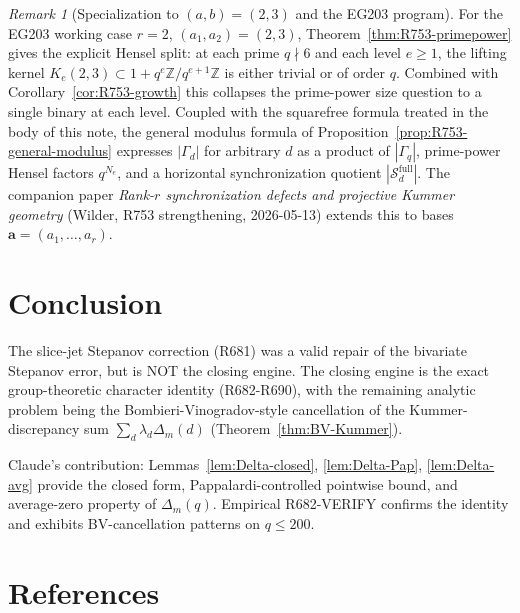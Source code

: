 \documentclass[12pt]{amsart}
\theoremstyle{definition}
\theoremstyle{remark}
\newtheorem{remark}{Remark}
\begin{document}
\begin{remark}[Specialization to $(a,b)=(2,3)$ and the EG203 program]
For the EG203 working case $r=2$, $(a_1,a_2)=(2,3)$, Theorem~\ref{thm:R753-primepower}
gives the explicit Hensel split: at each prime $q\nmid 6$ and each level $e\ge 1$, the
lifting kernel $K_e(2,3)\subset 1+q^e\mathbb Z/q^{e+1}\mathbb Z$ is either trivial or of
order $q$.  Combined with Corollary~\ref{cor:R753-growth} this collapses the prime-power
size question to a single binary at each level.  Coupled with the squarefree formula treated in the body of this note, the general
modulus formula of Proposition~\ref{prop:R753-general-modulus} expresses $|\Gamma_d|$ for
arbitrary $d$ as a product of $|\Gamma_q|$, prime-power Hensel factors $q^{N_e}$, and a
horizontal synchronization quotient $|\mathcal S_d^{\mathrm{full}}|$.  The companion paper
\emph{Rank-$r$ synchronization defects and projective Kummer geometry}
(Wilder, R753 strengthening, 2026-05-13) extends this to bases $\mathbf a=(a_1,\ldots,a_r)$.
\end{remark}

\section{Conclusion}

The slice-jet Stepanov correction (R681) was a valid repair of the bivariate Stepanov error,
but is NOT the closing engine. The closing engine is the exact group-theoretic character identity
(R682-R690), with the remaining analytic problem being the Bombieri-Vinogradov-style cancellation
of the Kummer-discrepancy sum $\sum_d \lambda_d \Delta_m(d)$ (Theorem~\ref{thm:BV-Kummer}).

Claude's contribution: Lemmas~\ref{lem:Delta-closed}, \ref{lem:Delta-Pap}, \ref{lem:Delta-avg}
provide the closed form, Pappalardi-controlled pointwise bound, and average-zero property of
$\Delta_m(q)$. Empirical R682-VERIFY confirms the identity and exhibits BV-cancellation patterns
on $q \le 200$.

\section*{References}
\end{document}
